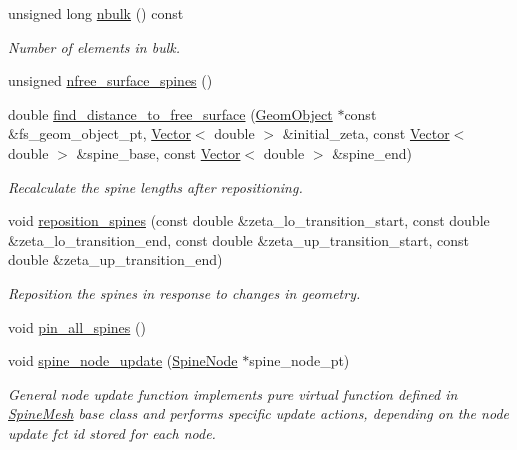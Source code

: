 \begin{DoxyCompactItemize}
unsigned long \hyperlink{classoomph_1_1BrethertonSpineMesh_a47184866746a1fce6dd0ca27ab7e17ce}{nbulk} () const
\begin{DoxyCompactList}\small\item\em Number of elements in bulk. \end{DoxyCompactList}\item 
unsigned \hyperlink{classoomph_1_1BrethertonSpineMesh_ade4d0f2933beddda517b949d80928a18}{nfree\+\_\+surface\+\_\+spines} ()
\item 
double \hyperlink{classoomph_1_1BrethertonSpineMesh_ac80488ae4db2da00e1b38f6f07e0ff9d}{find\+\_\+distance\+\_\+to\+\_\+free\+\_\+surface} (\hyperlink{classoomph_1_1GeomObject}{Geom\+Object} $\ast$const \&fs\+\_\+geom\+\_\+object\+\_\+pt, \hyperlink{classoomph_1_1Vector}{Vector}$<$ double $>$ \&initial\+\_\+zeta, const \hyperlink{classoomph_1_1Vector}{Vector}$<$ double $>$ \&spine\+\_\+base, const \hyperlink{classoomph_1_1Vector}{Vector}$<$ double $>$ \&spine\+\_\+end)
\begin{DoxyCompactList}\small\item\em Recalculate the spine lengths after repositioning. \end{DoxyCompactList}\item 
void \hyperlink{classoomph_1_1BrethertonSpineMesh_a0dfeac5bc9a4fa4bfdcd443def30dcdb}{reposition\+\_\+spines} (const double \&zeta\+\_\+lo\+\_\+transition\+\_\+start, const double \&zeta\+\_\+lo\+\_\+transition\+\_\+end, const double \&zeta\+\_\+up\+\_\+transition\+\_\+start, const double \&zeta\+\_\+up\+\_\+transition\+\_\+end)
\begin{DoxyCompactList}\small\item\em Reposition the spines in response to changes in geometry. \end{DoxyCompactList}\item 
void \hyperlink{classoomph_1_1BrethertonSpineMesh_a507ea97977b837f2f0d9647407d770cd}{pin\+\_\+all\+\_\+spines} ()
\item 
void \hyperlink{classoomph_1_1BrethertonSpineMesh_a981301706d4940cfb24d3d769a7a523b}{spine\+\_\+node\+\_\+update} (\hyperlink{classoomph_1_1SpineNode}{Spine\+Node} $\ast$spine\+\_\+node\+\_\+pt)
\begin{DoxyCompactList}\small\item\em General node update function implements pure virtual function defined in \hyperlink{classoomph_1_1SpineMesh}{Spine\+Mesh} base class and performs specific update actions, depending on the node update fct id stored for each node. \end{DoxyCompactList}\item 

\end{DoxyCompactItemize}
